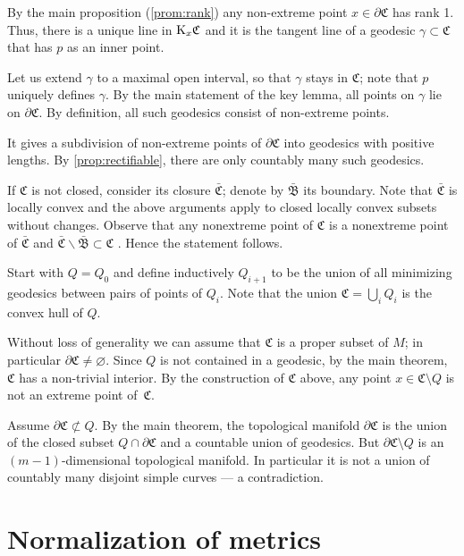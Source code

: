 \documentclass[a4paper,10pt]{article}
\begin{document}
By the main proposition (\ref{prom:rank}) any non-extreme point $x\in \partial \mathfrak C$ has rank 1.
Thus, there is a unique line in $\mathrm{K}_x\mathfrak C$ and it is the tangent line of a geodesic $\gamma\subset\mathfrak C$ that has $p$ as an inner point. 

Let us extend $\gamma$ to a maximal open interval, so that $\gamma$ stays in $\mathfrak C$;
note that $p$ uniquely defines $\gamma$. 
By the main statement of the key lemma, all points on $\gamma$ lie on $\partial \mathfrak C$.
By definition, all such geodesics consist of non-extreme points.

It gives a subdivision of non-extreme points of $\partial\mathfrak C$ into geodesics with positive lengths.
By \ref{prop:rectifiable}, there are only countably many such geodesics.

If $\mathfrak C$ is not closed, consider its closure $\bar {\mathfrak C}$;
denote by $\bar{\mathfrak{B}}$ its boundary.
Note that $\bar{\mathfrak C}$ is locally convex and the above arguments apply to closed locally convex subsets without changes.
Observe that any nonextreme point of $\mathfrak{C}$ is a  nonextreme point of $\bar{\mathfrak{C}}$ and $\bar{\mathfrak{C}}\backslash\bar{\mathfrak{B}}\subset\mathfrak{C}$ \cite[Lemma 1.5]{cheeger-gromoll}.
Hence the statement follows.
\qeds

Start with $Q=Q_0$ and define inductively $Q_{i+1}$ to be the union of all minimizing geodesics between pairs of points of $Q_i$.
Note that the union $\mathfrak{C}= \bigcup_{i} 
Q_i$ is the convex hull of $Q$.

Without loss of generality we can assume that $\mathfrak{C}$ is a proper subset of $M$; in particular $\partial\mathfrak{C}\ne \varnothing$.
Since $Q$ is not contained in a geodesic, by the main theorem, $\mathfrak{C}$ has a non-trivial interior.
By the construction of $\mathfrak{C}$ above, any point $x\in \mathfrak{C} \setminus Q$ is not an extreme point of~$\mathfrak{C}$.

Assume $\partial \mathfrak{C} \not\subset Q$.
By the main theorem, the topological manifold $\partial \mathfrak{C}$ is the union of the closed subset $Q\cap \partial \mathfrak{C}$ and a countable union of geodesics.
But $\partial \mathfrak{C} \setminus Q$ is an $(m-1)$-dimensional topological manifold.
In particular it is not a union of countably many disjoint simple curves --- a contradiction.
\qeds

\appendix

\section{Normalization of metrics}
\label{sec:normalization}
\end{document}
